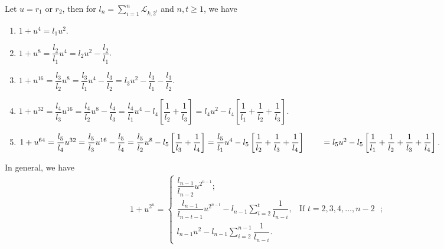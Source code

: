 \begin{lemma} Let $u=r_{1}$ or $r_{2}$, then for $l_n=\sum\limits_{i=1}^n\mathcal{L}_{k,2^i}$ and $n, t\geq 1$, we have \label{3.9}
\begin{enumerate}
\item $1+u^4=l_1u^2$.
\item $ 1+u^8=\dfrac{l_2}{l_1}u^4=l_2u^2-\dfrac{l_2}{l_1}$.
\item $ 1+u^{16}=\dfrac{l_3}{l_2}u^8=\dfrac{l_3}{l_1}u^4-\dfrac{l_3}{l_2}=l_3u^2-\dfrac{l_3}{l_1}-\dfrac{l_3}{l_2}$.
\item $ 1+u^{32}=\dfrac{l_4}{l_3}u^{16}=\dfrac{l_4}{l_2}u^8-\dfrac{l_4}{l_3}=\dfrac{l_4}{l_1}u^4-l_4\left[\dfrac{1}{l_2}+\dfrac{1}{l_3}\right]=l_4u^2-l_4\left[\dfrac{1}{l_1}+\dfrac{1}{l_2}+\dfrac{1}{l_3}\right]$.
\item $ 1+u^{64}=\dfrac{l_5}{l_4}u^{32}=\dfrac{l_5}{l_3}u^{16}-\dfrac{l_5}{l_4}=\dfrac{l_5}{l_2}u^8-l_5\left[\dfrac{1}{l_3}+\dfrac{1}{l_4}\right]=\dfrac{l_5}{l_1}u^4-l_5\left[\dfrac{1}{l_2}+\dfrac{1}{l_3}+\dfrac{1}{l_4}\right]\\\qquad=l_5u^2-l_5\left[\dfrac{1}{l_1}+\dfrac{1}{l_2}+\dfrac{1}{l_3}+\dfrac{1}{l_4}\right]$.
\end{enumerate}
In general, we have
\begin{align*}
 1+u^{2^n}= \begin{cases}
 \dfrac{l_{n-1}}{l_{n-2}}u^{2^{n-1}};\\
\dfrac{l_{n-1}}{l_{n-t-1}}u^{2^{n-t}}-l_{n-1}\sum\limits_{i=2}^{t}\dfrac{1}{l_{n-i}}, & \text{If $t=2, 3, 4,\hdots, n-2 $ };\\l_{n-1}u^2-l_{n-1}\sum\limits_{i=2}^{n-1}\dfrac{1}{l_{n-i}}.
 \end{cases}
\end{align*} 
\end{lemma}
